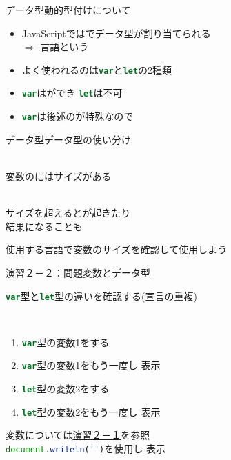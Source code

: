 \documentclass[dvipdfmx]{beamer}
\begin{document}
  \begin{frame}{データ型}{動的型付けについて}
    \begin{itemize}
      \setlength{\itemsep}{5mm}
      \item JavaScriptではでデータ型が割り当てられる\\
      $\Longrightarrow$ 言語という
      \item よく使われるのは\lstinline[language=javascript]|var|と\lstinline[language=javascript]|let|の2種類
      \item \lstinline[language=javascript]|var|はができ \lstinline[language=javascript]|let|は不可
      \item \lstinline[language=javascript]|var|は後述のが特殊なので 
    \end{itemize}
  \end{frame}
  
  \begin{frame}{データ型}{データ型の使い分け}
    \begin{description}
      \setlength{\itemsep}{5mm}
      \item[\alert{サイズ}による使い分け]\mbox{}\\変数のには\alert{サイズ}がある
      \item[\alert{オーバーフロー}]\mbox{}\\サイズを超えるとが起きたり\\結果になることも
    \end{description}
    \vspace{5mm}
    \textreferencemark 使用する言語で変数のサイズを確認して使用しよう
  \end{frame}

  \begin{frame}{演習２－２：問題}{変数とデータ型}
    \begin{Large}\lstinline[language=javascript]|var|型と\lstinline[language=javascript]|let|型の違いを確認する(\alert{宣言の重複})\end{Large}\\
    \begin{enumerate}
      \setlength{\itemsep}{5mm}
      \item \lstinline[language=javascript]|var|型の変数1をする
      \item \lstinline[language=javascript]|var|型の変数1をもう一度し 表示
      \item \lstinline[language=javascript]|let|型の変数2をする
      \item \lstinline[language=javascript]|let|型の変数2をもう一度し 表示
    \end{enumerate}
    \textreferencemark 変数については\hyperlink{ensyu2-1}{演習２－１}を参照\\\lstinline[language=javascript]|document.writeln('')|を使用し 表示
  \end{frame}
  
\end{document}
